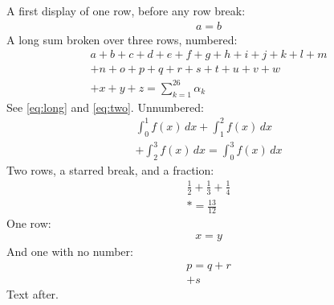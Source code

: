 \documentclass{article}
\begin{document}
A first display of one row, before any row break:
\begin{multline}
a = b
\end{multline}
A long sum broken over three rows, numbered:
\begin{multline}
a + b + c + d + e + f + g + h + i + j + k + l + m \\
+ n + o + p + q + r + s + t + u + v + w \\
+ x + y + z = \sum_{k=1}^{26} \alpha_k \label{eq:long}
\end{multline}
See \eqref{eq:long} and \eqref{eq:two}. Unnumbered:
\begin{multline*}
\int_0^1 f(x)\,dx + \int_1^2 f(x)\,dx \\[3pt]
+ \int_2^3 f(x)\,dx = \int_0^3 f(x)\,dx
\end{multline*}
Two rows, a starred break, and a fraction:
\begin{multline}
\frac{1}{2} + \frac{1}{3} + \frac{1}{4} \\*
= \frac{13}{12} \label{eq:two}
\end{multline}
One row:
\begin{multline}
x = y
\end{multline}
And one with no number:
\begin{multline}
p = q + r \nonumber \\
+ s
\end{multline}
Text after.
\end{document}
